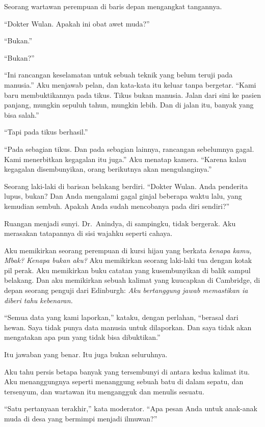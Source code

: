 \documentclass[11pt,twoside,openany]{book}
\begin{document}
Seorang wartawan perempuan di baris depan mengangkat tangannya.

``Dokter Wulan. Apakah ini obat awet muda?''

``Bukan.''

``Bukan?''

``Ini rancangan keselamatan untuk sebuah teknik yang belum teruji pada manusia.'' Aku menjawab pelan, dan kata-kata itu keluar tanpa bergetar. ``Kami baru membuktikannya pada tikus. Tikus bukan manusia. Jalan dari sini ke pasien panjang, mungkin sepuluh tahun, mungkin lebih. Dan di jalan itu, banyak yang bisa salah.''

``Tapi pada tikus berhasil.''

``Pada sebagian tikus. Dan pada sebagian lainnya, rancangan sebelumnya gagal. Kami menerbitkan kegagalan itu juga.'' Aku menatap kamera. ``Karena kalau kegagalan disembunyikan, orang berikutnya akan mengulanginya.''

Seorang laki-laki di barisan belakang berdiri. ``Dokter Wulan. Anda penderita lupus, bukan? Dan Anda mengalami gagal ginjal beberapa waktu lalu, yang kemudian sembuh. Apakah Anda sudah mencobanya pada diri sendiri?''

Ruangan menjadi sunyi. Dr.~Anindya, di sampingku, tidak bergerak. Aku merasakan tatapannya di sisi wajahku seperti cahaya.

Aku memikirkan seorang perempuan di kursi hijau yang berkata \emph{kenapa kamu, Mbak? Kenapa bukan aku?} Aku memikirkan seorang laki-laki tua dengan kotak pil perak. Aku memikirkan buku catatan yang kusembunyikan di balik sampul belakang. Dan aku memikirkan sebuah kalimat yang kuucapkan di Cambridge, di depan seorang penguji dari Edinburgh: \emph{Aku bertanggung jawab memastikan ia diberi tahu kebenaran.}

``Semua data yang kami laporkan,'' kataku, dengan perlahan, ``berasal dari hewan. Saya tidak punya data manusia untuk dilaporkan. Dan saya tidak akan mengatakan apa pun yang tidak bisa dibuktikan.''

Itu jawaban yang benar. Itu juga bukan seluruhnya.

Aku tahu persis betapa banyak yang tersembunyi di antara kedua kalimat itu. Aku menanggungnya seperti menanggung sebuah batu di dalam sepatu, dan tersenyum, dan wartawan itu mengangguk dan menulis sesuatu.

``Satu pertanyaan terakhir,'' kata moderator. ``Apa pesan Anda untuk anak-anak muda di desa yang bermimpi menjadi ilmuwan?''
\end{document}
